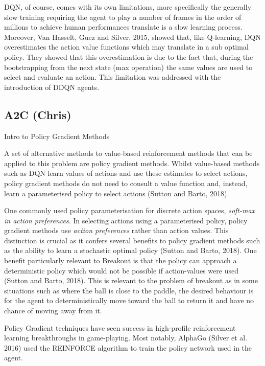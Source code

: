 \documentclass{article}
\begin{document}
DQN, of course, comes with its own limitations, more specifically the generally slow training requiring the agent to play a number of frames in the order of millions to achieve human performances translate is a slow learning process. Moreover, Van Hasselt, Guez and Silver, 2015, showed that, like Q-learning, DQN overestimates the action value functions which may translate in a sub optimal policy. They showed that this overestimation is due to the fact that, during the bootstrapping from the next state (max operation) the same values are used to select and evaluate an action. This limitation was addressed with the introduction of DDQN agents.



\subsection{A2C (Chris)}

Intro to Policy Gradient Methods

A set of alternative methods to value-based reinforcement methods that can be applied to this problem are policy gradient methods. Whilst value-based methods such as DQN learn values of actions and use these estimates to select actions, policy gradient methods do not need to consult a value function and, instead, learn a parameterised policy to select actions (Sutton and Barto, 2018).

One commonly used policy parameterisation for discrete action spaces, \emph{soft-max in action preferences}. In selecting actions using a parameterised policy, policy gradient methods use \emph{action preferences} rather than action values. This distinction is crucial as it confers several benefits to policy gradient methods such as the ability to learn a stochastic optimal policy (Sutton and Barto, 2018). One benefit particularly relevant to Breakout is that the policy can approach a deterministic policy which would not be possible if action-values were used (Sutton and Barto, 2018). This is relevant to the problem of breakout as in some situations such as where the ball is close to the paddle, the desired behaviour is for the agent to deterministically move toward the ball to return it and have no chance of moving away from it.

Policy Gradient techniques have seen success in high-profile reinforcement learning breakthroughs in game-playing. Most notably, AlphaGo (Silver et al. 2016) used the REINFORCE algorithm to train the policy network used in the agent.
\end{document}
